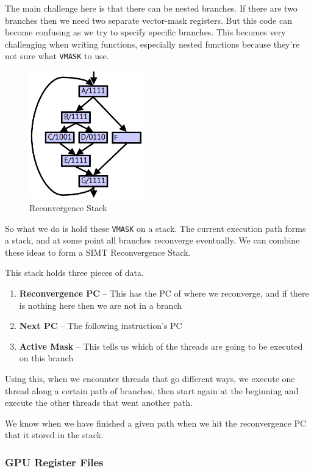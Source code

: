 \documentclass{article}
\begin{document}
The main challenge here is that there can be nested branches. If there are two branches then we need two separate vector-mask registers. But this code can become confusing as we try to specify specific branches. This becomes very challenging when writing functions, especially nested functions because they're not sure what \texttt{VMASK} to use.

 \begin{figure}[ht!]
\centering
\includegraphics[width=50mm]{img/reconvg.png}
\caption{Reconvergence Stack}
\end{figure}

So what we do is hold these \texttt{VMASK} on a stack. The current execution path forms a stack, and at some point all branches reconverge eventually. We can combine these ideas to form a SIMT Reconvergence Stack. 

This stack holds three pieces of data.

\begin{enumerate}
\item \textbf{Reconvergence PC} -- This has the PC of where we reconverge, and if there is nothing here then we are not in a branch

\item \textbf{Next PC} -- The following instruction's PC

\item \textbf{Active Mask} -- This tells us which of the threads are going to be executed on this branch 
\end{enumerate}

Using this, when we encounter threads that go different ways, we execute one thread along a certain path of branches, then start again at the beginning and execute the other threads that went another path. 


We know when we have finished a given path when we hit the reconvergence PC that it stored in the stack.

\subsubsection{GPU Register Files}
\end{document}
